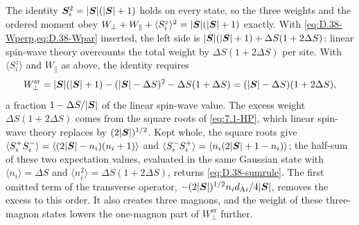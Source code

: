 The identity $\bm{S}_i^2 = |\bm{S}|(|\bm{S}| + 1)$ holds on every state, so the three weights and the ordered moment obey $W_\perp + W_\parallel + \langle S^z_i\rangle^2 = |\bm{S}|(|\bm{S}| + 1)$ exactly. With \cref{eq:D.38-Wperp,eq:D.38-Wpar} inserted, the left side is $|\bm{S}|(|\bm{S}| + 1) + \Delta S(1 + 2\Delta S)$: linear spin-wave theory overcounts the total weight by $\Delta S(1 + 2\Delta S)$ per site. With $\langle S^z_i\rangle$ and $W_\parallel$ as above, the identity requires
\begin{equation}
  W_\perp^{\mathrm{sr}} = |\bm{S}|(|\bm{S}| + 1) - (|\bm{S}| - \Delta S)^2 - \Delta S(1 + \Delta S) = (|\bm{S}| - \Delta S)(1 + 2\Delta S) ,
  \label{eq:D.38-sumrule}
\end{equation}
a fraction $1 - \Delta S/|\bm{S}|$ of the linear spin-wave value. The excess weight $\Delta S(1 + 2\Delta S)$ comes from the square roots of \cref{eq:7.1-HP}, which linear spin-wave theory replaces by $(2|\bm{S}|)^{1/2}$. Kept whole, the square roots give $\langle S^+_iS^-_i\rangle = \langle(2|\bm{S}| - n_i)(n_i + 1)\rangle$ and $\langle S^-_iS^+_i\rangle = \langle n_i(2|\bm{S}| + 1 - n_i)\rangle$; the half-sum of these two expectation values, evaluated in the same Gaussian state with $\langle n_i\rangle = \Delta S$ and $\langle n_i^2\rangle = \Delta S(1 + 2\Delta S)$, returns \cref{eq:D.38-sumrule}. The first omitted term of the transverse operator, $-(2|\bm{S}|)^{1/2}n_id_{\mathrm{A}i}/4|\bm{S}|$, removes the excess to this order. It also creates three magnons, and the weight of these three-magnon states lowers the one-magnon part of $W_\perp^{\mathrm{sr}}$ further.
